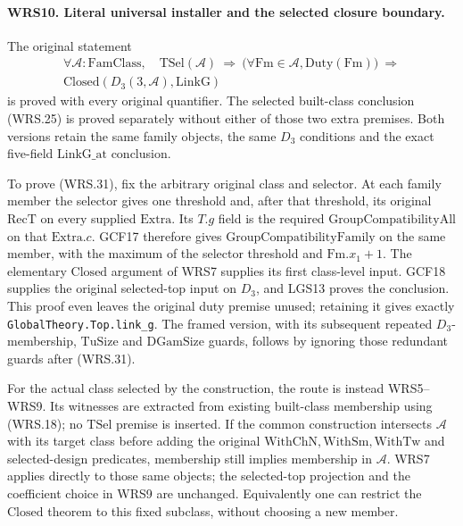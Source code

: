 \documentclass[11pt,a4paper]{article}
\numberwithin{equation}{section}
\theoremstyle{remark}\newtheorem{remark}[theorem]{Remark}
\begin{document}
\paragraph{WRS10. Literal universal installer and the selected closure boundary.}
\label{claim:WRS10}
The original statement
\[
 \begin{gathered}
 \forall\mathcal A:\mathrm{FamClass},\quad
 \mathrm{TSel}(\mathcal A)\ \Longrightarrow\
 \bigl(\forall\mathrm{Fm}\in\mathcal A,
                         \mathrm{Duty}(\mathrm{Fm})\bigr)
       \ \Longrightarrow\\
 \mathrm{Closed}(D_3(3,\mathcal A),\mathrm{LinkG})
 \end{gathered}                                                   \tag{WRS.31}
\]
is proved with every original quantifier.  The selected built-class
conclusion (WRS.25) is proved separately without either of those
two extra premises.  Both versions retain the same family objects,
the same \(D_3\) conditions and the exact five-field
\(\mathrm{LinkG\_\allowbreak at}\) conclusion.

To prove (WRS.31), fix the arbitrary original class and selector.
At each family member the selector gives one threshold and, after
that threshold, its original \(\mathrm{RecT}\) on every supplied
\(\mathrm{Extra}\).  Its \(T.g\) field is the required
\(\mathrm{GroupCompatibilityAll}\) on that \(\mathrm{Extra}.c\).
GCF17 therefore gives \(\mathrm{GroupCompatibilityFamily}\)
on the same member, with the maximum of the selector threshold
and \(\mathrm{Fm}.x_1+1\).  The elementary \(\mathrm{Closed}\)
argument of WRS7 supplies its first class-level input.
GCF18 supplies the original selected-top input on \(D_3\),
and LGS13 proves the conclusion.  This proof even leaves the
original duty premise unused; retaining it gives exactly
\texttt{Global\allowbreak Theory.\allowbreak Top.\allowbreak link\_\allowbreak g}.  The framed version, with
its subsequent repeated \(D_3\)-membership,
\(\mathrm{TuSize}\) and \(\mathrm{DGamSize}\) guards, follows
by ignoring those redundant guards after (WRS.31).

For the actual class selected by the construction, the route is
instead WRS5--WRS9.  Its witnesses are extracted from existing
built-class membership using (WRS.18); no \(\mathrm{TSel}\)
premise is inserted.  If the common construction intersects
\(\mathcal A\) with its target class before adding the original
\(\mathrm{WithChN},\mathrm{WithSm},\mathrm{WithTw}\) and
selected-design predicates, membership still implies membership
in \(\mathcal A\).  WRS7 applies directly to those same objects;
the selected-top projection and the coefficient choice in WRS9
are unchanged.  Equivalently one can restrict the \(\mathrm{Closed}\)
theorem to this fixed subclass, without choosing a new member.
\end{document}

